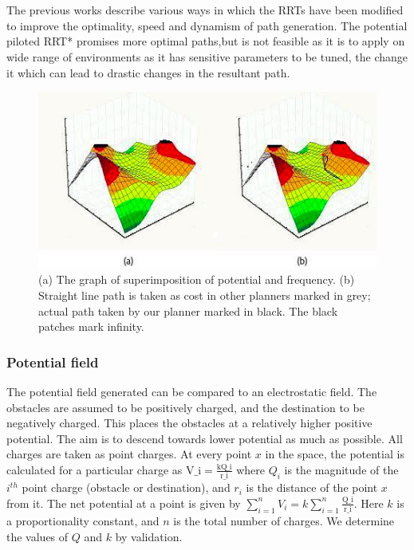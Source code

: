 \documentclass[runningheads]{llncs}
\begin{document}
\section{}
\vspace{-1mm}
The previous works describe various ways in which the RRTs have been modified to improve the optimality, speed and dynamism of path generation. The potential piloted RRT* promises more optimal paths,but is not feasible as it is to apply on wide range of environments as it has sensitive parameters to be tuned, the change it which can lead to drastic changes in the resultant path.

\begin{figure}
\begin{center}
\includegraphics[scale=0.8]{images2_tog_new2.png}
    \caption{(a) The graph of superimposition of potential and frequency. (b) Straight line path is taken as cost in other planners marked in grey; actual path taken by our planner marked in black. The black patches mark infinity.} \label{fig1}
\end{center}
\end{figure}

\subsubsection{Potential field}
The potential field generated can be compared to an electrostatic field. The obstacles are assumed to be positively charged, and the destination to be negatively charged. This places the obstacles at a relatively higher positive potential. The aim is to descend towards lower potential as much as possible. All charges are taken as point charges. At every point $x$ in the space, the potential is calculated for a particular charge as $\text{V_{i}}=\frac{\text{kQ_{i}}}{\text{r_{i}}}$ where $Q_{i}$ is the magnitude of the $i^{th}$ point charge (obstacle or destination), and $r_{i}$ is the distance of the point $x$ from it. The net potential at a point is given by $\sum_{i=1}^{n} V_{i} = k\sum_{i=1}^{n} \frac{\text{Q_{i}}}{\text{r_{i}}}$. Here $k$ is a proportionality constant, and $n$ is the total number of charges. We determine the values of $Q$ and $k$ by validation.
\end{document}
